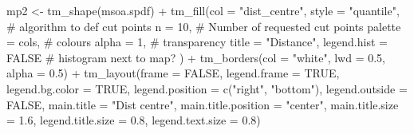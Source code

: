 \documentclass[
  letterpaper,
  DIV=11,
  numbers=noendperiod]{scrreprt}
\newenvironment{Shaded}{\begin{snugshade}}{\end{snugshade}}
\newcommand{\AttributeTok}[1]{\textcolor[rgb]{0.40,0.45,0.13}{#1}}
\newcommand{\CommentTok}[1]{\textcolor[rgb]{0.37,0.37,0.37}{#1}}
\newcommand{\ConstantTok}[1]{\textcolor[rgb]{0.56,0.35,0.01}{#1}}
\newcommand{\DecValTok}[1]{\textcolor[rgb]{0.68,0.00,0.00}{#1}}
\newcommand{\FloatTok}[1]{\textcolor[rgb]{0.68,0.00,0.00}{#1}}
\newcommand{\FunctionTok}[1]{\textcolor[rgb]{0.28,0.35,0.67}{#1}}
\newcommand{\NormalTok}[1]{\textcolor[rgb]{0.00,0.23,0.31}{#1}}
\newcommand{\OtherTok}[1]{\textcolor[rgb]{0.00,0.23,0.31}{#1}}
\newcommand{\SpecialCharTok}[1]{\textcolor[rgb]{0.37,0.37,0.37}{#1}}
\newcommand{\StringTok}[1]{\textcolor[rgb]{0.13,0.47,0.30}{#1}}
\begin{document}
\begin{Shaded}
\begin{Highlighting}[]
\NormalTok{mp2 }\OtherTok{\textless{}{-}}  \FunctionTok{tm\_shape}\NormalTok{(msoa.spdf) }\SpecialCharTok{+} 
  \FunctionTok{tm\_fill}\NormalTok{(}\AttributeTok{col =} \StringTok{"dist\_centre"}\NormalTok{, }
          \AttributeTok{style =} \StringTok{"quantile"}\NormalTok{, }\CommentTok{\# algorithm to def cut points}
          \AttributeTok{n =} \DecValTok{10}\NormalTok{, }\CommentTok{\# Number of requested cut points}
          \AttributeTok{palette =}\NormalTok{ cols, }\CommentTok{\# colours}
          \AttributeTok{alpha =} \DecValTok{1}\NormalTok{, }\CommentTok{\# transparency }
          \AttributeTok{title =} \StringTok{"Distance"}\NormalTok{, }
          \AttributeTok{legend.hist =} \ConstantTok{FALSE} \CommentTok{\# histogram next to map?}
\NormalTok{          ) }\SpecialCharTok{+}
  \FunctionTok{tm\_borders}\NormalTok{(}\AttributeTok{col =} \StringTok{"white"}\NormalTok{, }\AttributeTok{lwd =} \FloatTok{0.5}\NormalTok{, }\AttributeTok{alpha =} \FloatTok{0.5}\NormalTok{) }\SpecialCharTok{+}
  \FunctionTok{tm\_layout}\NormalTok{(}\AttributeTok{frame =} \ConstantTok{FALSE}\NormalTok{,}
            \AttributeTok{legend.frame =} \ConstantTok{TRUE}\NormalTok{, }\AttributeTok{legend.bg.color =} \ConstantTok{TRUE}\NormalTok{,}
            \AttributeTok{legend.position =} \FunctionTok{c}\NormalTok{(}\StringTok{"right"}\NormalTok{, }\StringTok{"bottom"}\NormalTok{),}
            \AttributeTok{legend.outside =} \ConstantTok{FALSE}\NormalTok{,}
            \AttributeTok{main.title =} \StringTok{"Dist centre"}\NormalTok{, }
            \AttributeTok{main.title.position =} \StringTok{"center"}\NormalTok{,}
            \AttributeTok{main.title.size =} \FloatTok{1.6}\NormalTok{,}
            \AttributeTok{legend.title.size =} \FloatTok{0.8}\NormalTok{,}
            \AttributeTok{legend.text.size =} \FloatTok{0.8}\NormalTok{)}



\end{Highlighting}
\end{Shaded}
\end{document}
